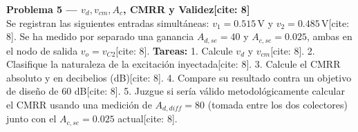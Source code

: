 \documentclass[11pt, a4paper]{article}
\begin{document}
\vspace{0.3cm}
\noindent \textbf{Problema 5 — $v_d, v_{cm}, A_c$, CMRR y Validez[cite: 8]} \\
Se registran las siguientes entradas simultáneas: $v_1=0.515\,\text{V}$ y $v_2=0.485\,\text{V}$[cite: 8].
Se ha medido por separado una ganancia $A_{d,se}=40$ y $A_{c,se}=0.025$, ambas en el nodo de salida $v_o=v_{C2}$[cite: 8].
\textbf{Tareas:}
1. Calcule $v_d$ y $v_{cm}$[cite: 8].
2. Clasifique la naturaleza de la excitación inyectada[cite: 8].
3. Calcule el CMRR absoluto y en decibelios (dB)[cite: 8].
4. Compare su resultado contra un objetivo de diseño de 60 dB[cite: 8].
5. Juzgue si sería válido metodológicamente calcular el CMRR usando una medición de $A_{d,diff}=80$ (tomada entre los dos colectores) junto con el $A_{c,se}=0.025$ actual[cite: 8].
\end{document}
